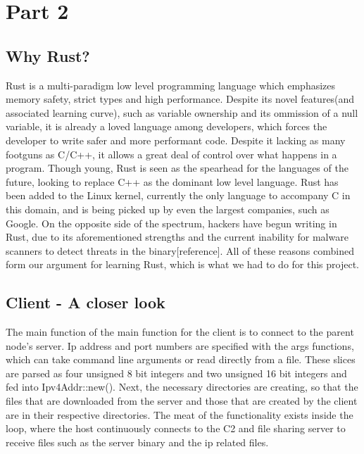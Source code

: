 \documentclass[../main.tex]{subfiles}
\begin{document}
	\chapter{Part 2}


	\section{Why Rust?}


Rust is a multi-paradigm low level programming language which emphasizes memory safety, strict types and high performance. Despite its novel features(and associated learning curve),
such as variable ownership and its ommission of a null variable, it is already a loved language among developers, which forces the developer to write safer and more performant code.
Despite it lacking as many footguns as C/C++, it allows a great deal of control over what happens in a program. Though young, Rust is seen as the spearhead for the languages of the 
future, looking to replace C++ as the dominant low level language. Rust has been added to the Linux kernel, currently the only language to accompany C in this domain, and is being 
picked up by even the largest companies, such as Google. On the opposite side of the spectrum, hackers have begun writing in Rust, due to its aforementioned strengths and the 
current inability for malware scanners to detect threats in the binary[reference]. All of these reasons combined form our argument for learning Rust, which is what we had to do for
this project.

	\vspace{10pt}


	\section{Client - A closer look}


The main function of the main function for the client is to connect to the parent node's server. Ip address and port numbers are specified with the args functions, which can take
command line arguments or read directly from a file. These slices are parsed as four unsigned 8 bit integers and two unsigned 16 bit integers and fed into Ipv4Addr::new().
Next, the necessary directories are creating, so that the files that are downloaded from the server and those that are created by the client are in their respective directories. 
The meat of the functionality exists inside the loop, where the host continuously connects to the C2 and file sharing server to receive files such as the server binary and the ip
related files. 
	\vspace{10pt}
\end{document}
